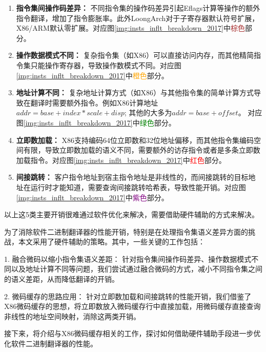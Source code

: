 \documentclass{Style/ucasproposal}%
\begin{document}
\begin{enumerate}
  \item \textbf{指令集间操作码差异：} 不同指令集的操作码差异引起Eflags计算等操作的额外指令翻译，增加了指令膨胀率。此外LoongArch对于子寄存器默认符号扩展，X86/ARM默认零扩展。对应图\ref{img:insts_inflt_breakdown_2017}中\textcolor{brown}{棕色}部分。
  
  \item \textbf{操作数据模式不同：} 复杂指令集（如X86）可以直接访问内存，而其他精简指令集只能操作寄存器，导致操作数模式不同。对应图\ref{img:insts_inflt_breakdown_2017}中\textcolor{orange}{橙色}部分。
  
  \item \textbf{地址计算不同：} 复杂地址计算方式（如X86）与其他指令集的简单计算方式导致在翻译时需要额外指令。例如X86计算地址$addr = base + index * scale +disp$; 其他的大多为$addr = base + offset$。 对应图\ref{img:insts_inflt_breakdown_2017}中\textcolor{green}{绿色}部分。
  
  \item \textbf{立即数加载：} X86支持编码64位立即数和32位地址偏移，而其他指令集编码空间有限，导致立即数加载的语义不同，需要额外的访存指令或者是多条立即数加载指令。对应图\ref{img:insts_inflt_breakdown_2017}中\textcolor{red}{红色}部分。
  
  \item \textbf{间接跳转：} 客户指令地址到宿主指令地址是非线性的，而间接跳转的目标地址在运行时才能知道，需要查询间接跳转哈希表，导致性能开销。对应图\ref{img:insts_inflt_breakdown_2017}中\textcolor{purple}{紫色}部分。
  
\end{enumerate}

以上这5类主要开销很难通过软件优化来解决，需要借助硬件辅助的方式来解决。

为了消除软件二进制翻译器的性能开销，特别是在处理指令集语义差异方面的挑战，本文采用了硬件辅助的策略。其中，一些关键的工作包括：

1. 融合微码以缩小指令集语义差距： 针对指令集间操作码差异、操作数据模式不同以及地址计算不同等问题，我们尝试通过融合微码的方式，减小不同指令集之间的语义差距，从而降低翻译的开销。

2. 微码缓存的思路应用： 针对立即数加载和间接跳转的性能开销，我们借鉴了X86微码缓存的思想，将立即数放入微码缓存行中直接加载，用微码缓存直接查询非线性的地址空间映射，消除这两类开销。

接下来，将介绍与X86微码缓存相关的工作，探讨如何借助硬件辅助手段进一步优化软件二进制翻译器的性能。
\end{document}
